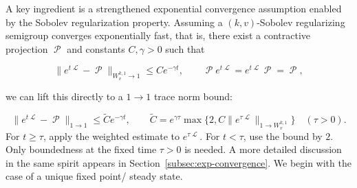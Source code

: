 \documentclass[11pt]{article}
\theoremstyle{myplain}
\theoremstyle{mydefinition}
\theoremstyle{remark}
\DeclareMathOperator{\cL}{\mathcal{L}}
\DeclareMathOperator{\cP}{\mathcal{P}}
\DeclareMathOperator{\1}{\mathds{1}}
\begin{document}
        A key ingredient is a strengthened exponential convergence assumption enabled by the Sobolev regularization property. Assuming a $(k,v)$-Sobolev regularizing semigroup converges exponentially fast, that is, there exist a contractive projection $\cP$ and constants $C,\gamma>0$ such that
        
        \begin{equation*}
            \|e^{t\cL}-\cP\|_{W_v^{k,1}\to1}\leq Ce^{-\gamma t},\qquad
            \cP e^{t\cL}=e^{t\cL}\cP=\cP,
        \end{equation*}
        
        we can lift this directly to a $1\rightarrow 1$ trace norm bound:
        
        \begin{equation}\label{eq:regularization-upgrades-mixing}
            \|e^{t\cL}-\cP\|_{1\to1}\leq\widetilde C e^{-\gamma t},\qquad
            \widetilde C=e^{\gamma\tau}\max\{2,C\|e^{\tau\cL}\|_{1\to W_v^{k,1}}\}
            \quad(\tau>0).
        \end{equation}
        For $t\geq\tau$, apply the weighted estimate to $e^{\tau\cL}$. For $t<\tau$, use the bound by $2$. Only boundedness at the fixed time $\tau>0$ is needed. A more detailed discussion in the same spirit appears in Section~\ref{subsec:exp-convergence}. We begin with the case of a unique fixed point/ steady state.
\end{document}
